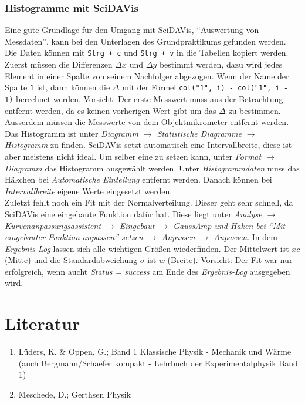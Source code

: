 \subsubsection*{Histogramme mit SciDAVis}
Eine gute Grundlage für den Umgang mit SciDAVis, ``Auswertung von Messdaten'', kann bei den Unterlagen des Grundpraktikums gefunden werden.\\
Die Daten können mit \verb|Strg + c| und \verb|Strg + v|  in die Tabellen kopiert werden. Zuerst müssen die Differenzen $\Delta x$ und $\Delta y$ bestimmt werden, dazu wird jedes Element in einer Spalte von seinem Nachfolger abgezogen. Wenn der Name der Spalte \verb|1|  ist, dann können die $\Delta$ mit der Formel \verb|col("1", i) - col("1", i - 1)| berechnet werden. Vorsicht: Der erste Messwert muss aus der Betrachtung entfernt werden, da es keinen vorherigen Wert gibt um das $\Delta$ zu bestimmen. Ausserdem müssen die Messwerte von dem Objektmikrometer entfernt werden.\\
Das Histogramm ist unter \emph{Diagramm $\rightarrow$ Statistische Diagramme $\rightarrow$ Histogramm} zu finden. SciDAVis setzt automatisch eine Intervallbreite, diese ist aber meistens nicht ideal. Um selber eine zu setzen kann, unter \emph{Format $\rightarrow$ Diagramm} das Histogramm ausgewählt werden. Unter \emph{Histogrammdaten} muss das Häkchen bei \emph{Automatische Einteilung} entfernt werden. Danach können bei \emph{Intervallbreite} eigene Werte eingesetzt werden.\\
Zuletzt fehlt noch ein Fit mit der Normalverteilung. Dieser geht sehr schnell, da SciDAVis eine eingebaute Funktion dafür hat. Diese liegt unter \emph{Analyse $\rightarrow$ Kurvenanpassungsassistent $\rightarrow$ Eingebaut $\rightarrow$ GaussAmp und Haken bei ``Mit eingebauter Funktion anpassen'' setzen $\rightarrow$ Anpassen $\rightarrow$ Anpassen}. In dem \emph{Ergebnis-Log} lassen sich alle wichtigen Größen wiederfinden. Der Mittelwert ist $xc$ (Mitte) und die Standardabweichung $\sigma$ ist $w$ (Breite). Vorsicht: Der Fit war nur erfolgreich, wenn aucht \emph{Status = success} am Ende des \emph{Ergebnis-Log} ausgegeben wird.


\section*{Literatur}

\begin{enumerate}

  \item Lüders, K. \& Oppen, G.; Band 1 Klassische Physik - Mechanik und Wärme\\ (auch Bergmann/Schaefer kompakt - Lehrbuch der Experimentalphysik Band 1)

  \item Meschede, D.; Gerthsen Physik

\end{enumerate}
